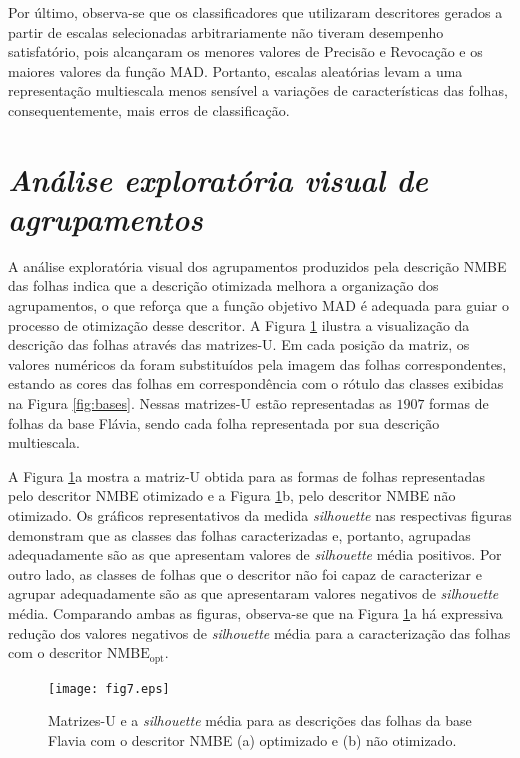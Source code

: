 {Por último, observa-se que os classificadores que utilizaram descritores gerados a partir de escalas selecionadas arbitrariamente não tiveram desempenho satisfatório, pois alcançaram os menores valores de Precisão e Revocação e os maiores valores da função MAD. Portanto, escalas aleatórias levam a uma representação multiescala menos sensível a variações de características das folhas, consequentemente, mais erros de classificação. 


\section{\emph{Análise exploratória visual de agrupamentos}}
A análise exploratória visual dos agrupamentos  produzidos pela descrição NMBE das folhas indica que a descrição otimizada melhora a organização dos agrupamentos, o que reforça que a função objetivo MAD é adequada para guiar o processo de otimização desse descritor. A Figura \ref{fig:MatrizU_leaves_256}  ilustra a visualização da descrição das folhas através  das matrizes-U. Em cada posição da matriz, os valores numéricos da foram substituídos pela imagem das folhas correspondentes, estando as cores das folhas em correspondência com o rótulo das classes exibidas na Figura \ref {fig:bases}. Nessas matrizes-U estão representadas as $1907$ formas de folhas da base Flávia, sendo cada folha representada por sua descrição multiescala.

A Figura \ref{fig:MatrizU_leaves_256}a mostra a matriz-U obtida para as formas de folhas representadas pelo descritor NMBE otimizado e a Figura \ref{fig:MatrizU_leaves_256}b, pelo descritor NMBE não otimizado. Os gráficos representativos da medida \emph{silhouette} nas respectivas figuras demonstram que as classes das folhas caracterizadas e, portanto, agrupadas adequadamente são as que apresentam valores de \emph{silhouette} média positivos. Por outro lado, as classes de folhas que o descritor não foi capaz de caracterizar e agrupar adequadamente são as que apresentaram valores negativos de \emph{silhouette} média. Comparando ambas as figuras, observa-se que na Figura \ref{fig:MatrizU_leaves_256}a há expressiva redução dos valores negativos de \emph{silhouette} média para a caracterização das folhas com o descritor $\operatorname{NMBE_{opt}}$. 

\begin{figure}[t]
\caption{\label{fig:MatrizU_leaves_256} Matrizes-U e a \emph{silhouette} média para as descrições das folhas da base Flavia com o descritor NMBE (a) optimizado e (b) não otimizado.}
\centering
\texttt{[image: fig7.eps]}
\end{figure}
}
